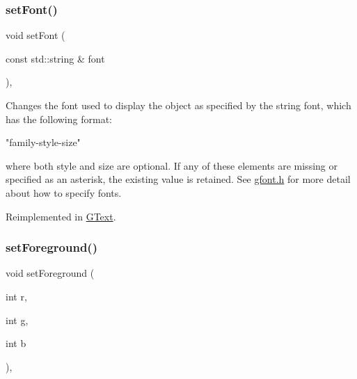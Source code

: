 \mbox{\label{classsgl_1_1GObject_a8e096e8818d838aceae1d46d58fb3a7b}} 
\subsubsection{\texorpdfstring{set\+Font()}{setFont()}\hspace{0.1cm}{\footnotesize\ttfamily [2/2]}}
{\footnotesize\ttfamily void set\+Font (\begin{DoxyParamCaption}\item[{const std\+::string \&}]{font }\end{DoxyParamCaption})\hspace{0.3cm}{\ttfamily [virtual]}, {\ttfamily [inherited]}}



Changes the font used to display the object as specified by the string {\ttfamily font}, which has the following format\+: 


\begin{DoxyPre}
"family-style-size"
\end{DoxyPre}


where both {\ttfamily style} and {\ttfamily size} are optional. If any of these elements are missing or specified as an asterisk, the existing value is retained. See \mbox{\hyperlink{gfont_8h_source}{gfont.\+h}} for more detail about how to specify fonts. 

Reimplemented in \mbox{\hyperlink{classsgl_1_1GText_a51367c9fd2709973b1f7238734f93891}{G\+Text}}.

\mbox{\label{classsgl_1_1GObject_ad18e8fab1e02a4e9b75c6730212558eb}} 
\subsubsection{\texorpdfstring{set\+Foreground()}{setForeground()}\hspace{0.1cm}{\footnotesize\ttfamily [1/3]}}
{\footnotesize\ttfamily void set\+Foreground (\begin{DoxyParamCaption}\item[{int}]{r,  }\item[{int}]{g,  }\item[{int}]{b }\end{DoxyParamCaption})\hspace{0.3cm}{\ttfamily [virtual]}, {\ttfamily [inherited]}}



